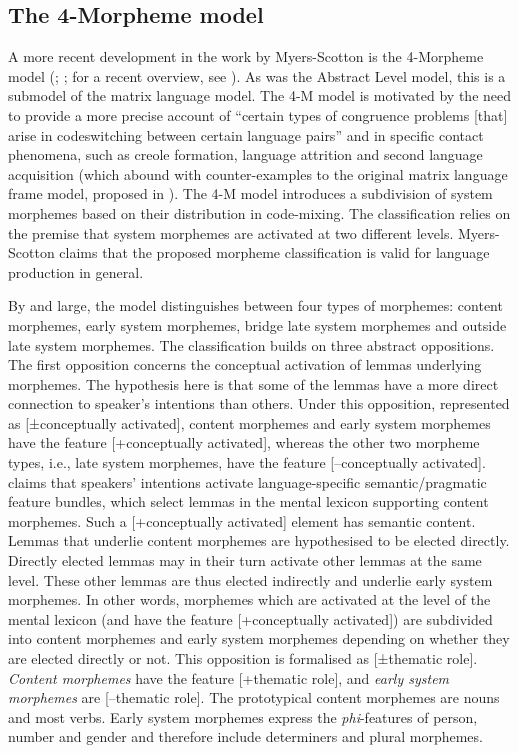 \subsection{The 4-Morpheme model}
A more recent development in the work by Myers-Scotton is the 4-Morpheme model (\citeyear{myers-scotton-matrix-2001}; \citeyear[73--82]{myers-scotton-contact-2002}; for a recent overview, see \citealt[][]{myers-scotton-jake16}). As was the Abstract Level model, this is a submodel of the matrix language model. The 4-M model is motivated by the need to provide a more precise account of ``certain types of congruence problems [that] arise in codeswitching between certain language pairs'' \citep[42]{myers-scotton-matrix-2001} and in specific contact phenomena, such as creole formation, language attrition and second language acquisition (which abound with counter-examples to the original matrix language frame model, proposed in \citealt{myers-scotton-duelling-1993}). The 4-M model introduces a subdivision of system morphemes based on their distribution in code-mixing. The classification relies on the premise that system morphemes are activated at two different levels. Myers-Scotton claims that the proposed morpheme classification is valid for language production in general.

By and large, the model distinguishes between four types of morphemes: content morphemes, early system morphemes, bridge late system morphemes and outside late system morphemes. The classification builds on three abstract oppositions. The first opposition concerns the conceptual activation of lemmas underlying morphemes. The hypothesis here is that some of the lemmas have a more direct connection to speaker's intentions than others. Under this opposition, represented as [±conceptually activated], content morphemes and early system morphemes have the feature [+conceptually activated], whereas the other two morpheme types, i.e., late system morphemes, have the feature [--conceptually activated]. \citet{myers-scotton-contact-2002} claims that speakers' intentions activate language-specific semantic/pragmatic feature bundles, which select lemmas in the mental lexicon supporting content morphemes. Such a [+conceptually activated] element has semantic content. Lemmas that underlie content morphemes are hypothesised to be elected directly. Directly elected lemmas may in their turn activate other lemmas at the same level. These other lemmas are thus elected indirectly and underlie early system morphemes. In other words, morphemes  which are activated at the level of the mental lexicon (and have the feature [+conceptually activated]) are subdivided into content morphemes and early system morphemes depending on whether they are elected directly or not. This opposition is formalised as [±thematic role]. \textit{Content morphemes} have the feature [+thematic role], and \textit{early system morphemes} are [--thematic role]. The prototypical content morphemes are nouns and most verbs. Early system morphemes express the \textit{phi}-features of person, number and gender and therefore include determiners and plural morphemes.

